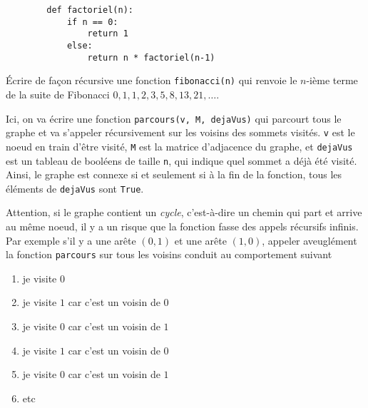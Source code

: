     \begin{verbatim}
        def factoriel(n):
            if n == 0:
                return 1
            else:
                return n * factoriel(n-1)
    \end{verbatim}

\ques Écrire de façon récursive une fonction \texttt{fibonacci(n)} qui renvoie le $ n $-ième terme de la suite de Fibonacci $ 0, 1, 1, 2, 3, 5, 8, 13, 21, \ldots $.

    Ici, on va écrire une fonction \texttt{parcours(v, M, dejaVus)} qui parcourt tous le graphe et va s'appeler récursivement sur les voisins des sommets visités. \texttt{v} est le noeud en train d'être visité, \texttt{M} est la matrice d'adjacence du graphe, et \texttt{dejaVus} est un tableau de booléens de taille \texttt{n}, qui indique quel sommet a déjà été visité. Ainsi, le graphe est connexe si et seulement si à la fin de la fonction, tous les éléments de \texttt{dejaVus} sont \texttt{True}.

    Attention, si le graphe contient un \textit{cycle}, c'est-à-dire un chemin qui part et arrive au même noeud, il y a un risque que la fonction fasse des appels récursifs infinis. Par exemple s'il y a une arête $ (0, 1) $ et une arête $ (1, 0) $, appeler aveuglément la fonction \texttt{parcours} sur tous les voisins conduit au comportement suivant
\begin{enumerate}
    \item je visite $ 0 $
    \item je visite $ 1 $ car c'est un voisin de $ 0 $
    \item je visite $ 0 $ car c'est un voisin de $ 1 $
    \item je visite $ 1 $ car c'est un voisin de $ 0 $
    \item je visite $ 0 $ car c'est un voisin de $ 1 $
    \item etc
\end{enumerate}

